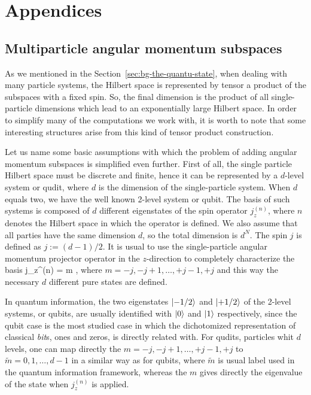 \renewcommand\thesubsection{\Alph{subsection}}
\section*{Appendices}

\subsection{Multiparticle angular momentum subspaces}
\label{app:angular-subspaces}

As we mentioned in the Section~\ref{sec:bg-the-quantu-state}, when dealing with many particle systems, the Hilbert space is represented by tensor a product of the subspaces with a fixed spin.
So, the final dimension is the product of all single-particle dimensions which lead to an exponentially large Hilbert space.
In order to simplify many of the computations we work with, it is worth to note that some interesting structures arise from this kind of tensor product construction.

Let us name some basic assumptions with which the problem of adding angular momentum subspaces is simplified even further.
First of all, the single particle Hilbert space must be discrete and finite, hence it can be represented by a $d$-level system or qudit, where $d$ is the dimension of the single-particle system.
When $d$ equals two, we have the well known 2-level system or qubit.
The basis of such systems is composed of $d$ different eigenstates of the spin operator $j_z^{(n)}$, where $n$ denotes the Hilbert space in which the operator is defined.
We also assume that all parties have the same dimension $d$, so the total dimension is $d^N$.
The spin $j$ is defined as $j:=(d-1)/2$.
It is usual to use the single-particle angular momentum projector operator in the $z$-direction to completely characterize the basis
\be
  j_z^{(n)} = m ,
\ee
where $m = -j,-j+1,\dots,+j-1,+j$ and this way the necessary $d$ different pure states are defined.

In quantum information, the two eigenstates $\vert{-1/2}\rangle$ and $\vert{+1/2}\rangle$ of the 2-level systems, or qubits, are usually identified with $\vert{0}\rangle$ and $\vert{1}\rangle$ respectively, since the qubit case is the most studied case in which the dichotomized representation of classical \emph{bit}s, ones and zeros, is directly related with.
For qudits, particles whit $d$ levels, one can map directly the $m=-j,-j+1,\dots,+j-1,+j$ to $\tilde{m}=0,1,\dots,d-1$ in a similar way as for qubits, where $\tilde{m}$ is usual label used in the quantum information framework, whereas the $m$ gives directly the eigenvalue of the state when $j_z^{(n)}$ is applied.

